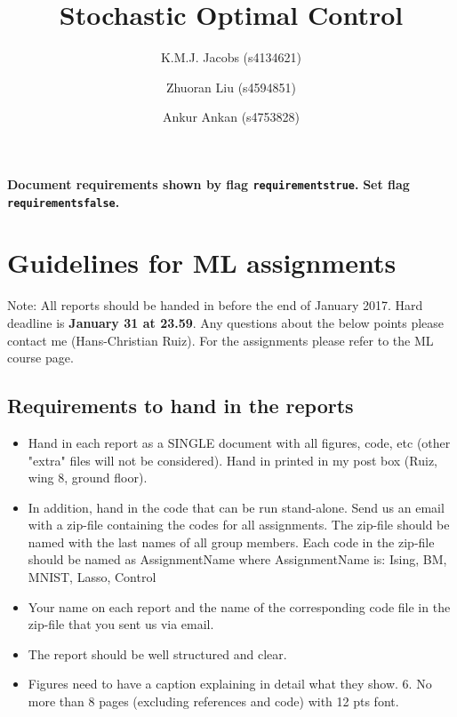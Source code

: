 \documentclass[10pt,a4paper]{article}
\author{K.M.J. Jacobs (s4134621) \and Zhuoran Liu (s4594851) \and Ankur Ankan (s4753828)}
\title{Stochastic Optimal Control}
\newif\ifrequirements
\begin{document}
\maketitle

\newpage
\tableofcontents
\newpage

\ifrequirements
\color{red}
\textbf{Document requirements shown by flag \texttt{requirementstrue}.}
\textbf{Set flag \texttt{requirementsfalse}.}

\color{blue}
\section{Guidelines for ML assignments}
Note: All reports should be handed in before the end of January 2017. Hard deadline is \textbf{January 31 at 23.59}. Any questions about the below points please contact me (Hans-Christian Ruiz). For the assignments please refer to the ML course page.

\subsection{Requirements to hand in the reports}
\begin{itemize}
\item Hand in each report as a SINGLE document with all figures, code, etc (other "extra" files will not be considered). Hand in printed in my post box (Ruiz, wing 8, ground floor).
\item In addition, hand in the code that can be run stand-alone. Send us an email with a zip-file containing the codes for all assignments. The zip-file should be named with the last names of all group members. Each code in the zip-file should be named as AssignmentName where AssignmentName is: Ising, BM, MNIST, Lasso, Control
\item Your name on each report and the name of the corresponding code file in the zip-file that you sent us via email.
\item The report should be well structured and clear.
\item Figures need to have a caption explaining in detail what they show. 6. No more than 8 pages (excluding references and code) with 12 pts font.
\end{itemize}
\end{document}
